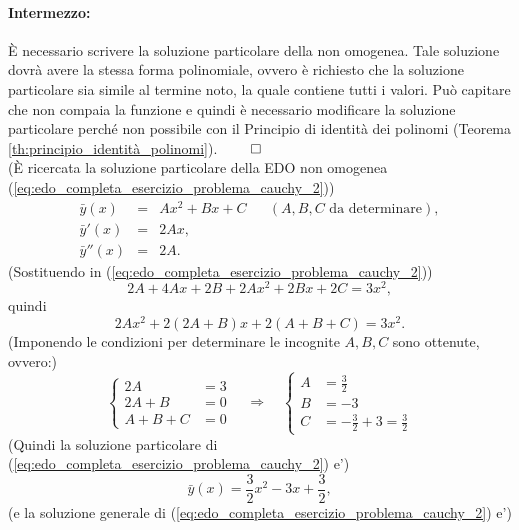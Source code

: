 \begin{example}
	\paragraph{Intermezzo:} È necessario scrivere la soluzione particolare della non omogenea. Tale soluzione dovrà avere la stessa forma polinomiale, ovvero è richiesto che la soluzione particolare sia simile al termine noto, la quale contiene tutti i valori. Può capitare che non compaia la funzione e quindi è necessario modificare la soluzione particolare perché non possibile con il Principio di identità dei polinomi (Teorema \ref{th:principio_identità_polinomi}). $\qed$\\
	(È ricercata la soluzione particolare della EDO non omogenea (\ref{eq:edo_completa_esercizio_problema_cauchy_2}))
	\begin{equation*}
		\begin{matrix}
			\bar y(x) &=& A x^2 + Bx + C && (A,B,C \text{ da determinare}),\\
			\bar y'(x) &=& 2Ax,\\
			\bar y''(x) &=& 2A.
		\end{matrix}
	\end{equation*}
	(Sostituendo in (\ref{eq:edo_completa_esercizio_problema_cauchy_2}))
	\begin{equation*}
		2A + 4Ax + 2B + 2Ax^2 + 2Bx + 2C = 3x^2,
	\end{equation*}
	quindi
	\begin{equation*}
		2A x^2 + 2(2A+B)x + 2(A+B+C) = 3x^2.
	\end{equation*}
	(Imponendo le condizioni per determinare le incognite $A,B,C$ sono ottenute, ovvero:)
	\begin{equation*}
		\begin{cases}
			2A &= 3\\
			2 A + B &= 0\\
			A + B + C &=0 
		\end{cases}\quad\Longrightarrow\quad
		\begin{cases}
			A &= \frac{3}{2}\\
			B &= -3\\
			C &= -\frac{3}{2} + 3 = \frac{3}{2}
		\end{cases}
	\end{equation*}
	(Quindi la soluzione particolare di (\ref{eq:edo_completa_esercizio_problema_cauchy_2}) e')
	\begin{equation*}
		\bar y(x) = \frac{3}{2}x^2 -3x + \frac{3}{2},
	\end{equation*}
	(e la soluzione generale di (\ref{eq:edo_completa_esercizio_problema_cauchy_2}) e')

\end{example}

